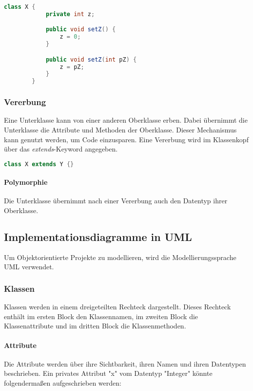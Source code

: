 \documentclass{article}
\begin{document}
	\begin{lstlisting}[language=Java, caption=Ein Beispiel für Überladung]
		class X {
			private int z;

			public void setZ() {
				z = 0;
			}

			public void setZ(int pZ) {
				z = pZ;
			}
		}
	\end{lstlisting}

	\subsubsection{Vererbung}
	Eine Unterklasse kann von einer anderen Oberklasse erben. Dabei übernimmt die Unterklasse die Attribute und Methoden der Oberklasse. Dieser Mechanismus kann genutzt werden, um Code einzusparen. Eine Vererbung wird im Klassenkopf über das \textit{extends}-Keyword angegeben.

	\begin{lstlisting}[language=Java, caption=Vererbung im Klassenkopf]
		class X extends Y {}
	\end{lstlisting}

	\paragraph{Polymorphie}
	Die Unterklasse übernimmt nach einer Vererbung auch den Datentyp ihrer Oberklasse.

	\newpage

	\subsection{Implementationsdiagramme in UML}
	Um Objektorientierte Projekte zu modellieren, wird die Modellierungssprache UML verwendet.

	\subsubsection{Klassen}
	Klassen werden in einem dreigeteilten Rechteck dargestellt. Dieses Rechteck enthält im ersten Block den Klassennamen, im zweiten Block die Klassenattribute und im dritten Block die Klassenmethoden.

	\paragraph{Attribute}
	Die Attribute werden über ihre Sichtbarkeit, ihren Namen und ihren Datentypen beschrieben. Ein privates Attribut "x" vom Datentyp "Integer" könnte folgendermaßen aufgeschrieben werden:
\end{document}
